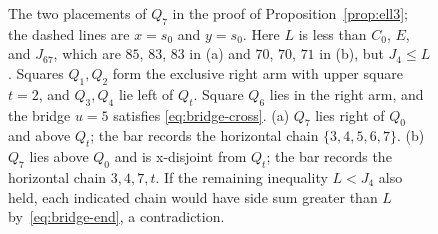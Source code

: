 \documentclass[12pt]{amsart}
\theoremstyle{definition}
\theoremstyle{remark}
\numberwithin{equation}{section}
\numberwithin{figure}{section}
\numberwithin{table}{section}
\begin{document}
\begin{figure}[t]
\begin{minipage}[t]{0.45\textwidth}
\end{minipage}
\caption{The two placements of $Q_7$ in the proof of
Proposition~\ref{prop:ell3}; the dashed lines are $x=s_0$ and $y=s_0$. Here
$L$ is less than $C_0$, $E$, and $J_{67}$, which are $85$, $83$, $83$ in (a)
and $70$, $70$, $71$ in (b), but $J_4\le L$. Squares $Q_1,Q_2$ form the
exclusive right arm with upper square $t=2$, and $Q_3,Q_4$ lie left of
$Q_t$. Square $Q_6$ lies in the right arm, and the bridge $u=5$ satisfies
\eqref{eq:bridge-cross}. (a) $Q_7$ lies right of $Q_0$ and above $Q_t$; the
bar records the horizontal chain $\{3,4,5,6,7\}$. (b) $Q_7$ lies above $Q_0$
and is x-disjoint from $Q_t$; the bar records the horizontal chain
$3,4,7,t$. If the remaining inequality $L<J_4$ also held, each indicated
chain would have side sum greater than $L$ by~\eqref{eq:bridge-end}, a
contradiction.}
\label{fig:bridge}
\end{figure}
\end{document}

